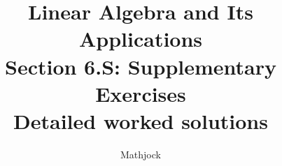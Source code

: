 
\title{\textbf{Linear Algebra and Its Applications}\\[0.3em]Section 6.S: Supplementary Exercises\\[0.3em]\large Detailed worked solutions}
\author{Mathjock}
\date{}

\maketitle
\bookinfo
\tableofcontents
\clearpage
\renewcommand{\thesection}{6.S}
\renewcommand{\theHsection}{6.S}
\setcounter{section}{0}


